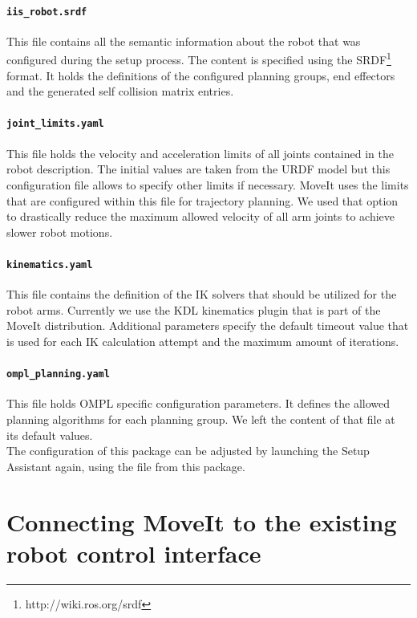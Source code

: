 \paragraph{\texttt{iis\_robot.srdf}}
This file contains all the semantic information about the robot that was configured during the setup process. The content is specified using the SRDF\footnote{http://wiki.ros.org/srdf} format. It holds the definitions of the configured planning groups, end effectors and the generated self collision matrix entries.

\paragraph{\texttt{joint\_limits.yaml}}
This file holds the velocity and acceleration limits of all joints contained in the robot description. The initial values are taken from the URDF model but this configuration file allows to specify other limits if necessary. MoveIt uses the limits that are configured within this file for trajectory planning. We used that option to drastically reduce the maximum allowed velocity of all arm joints to achieve slower robot motions.

\paragraph{\texttt{kinematics.yaml}}
This file contains the definition of the IK solvers that should be utilized for the robot arms. Currently we use the KDL kinematics plugin that is part of the MoveIt distribution. Additional parameters specify the default timeout value that is used for each IK calculation attempt and the maximum amount of iterations.

\paragraph{\texttt{ompl\_planning.yaml}}
This file holds OMPL specific configuration parameters. It defines the allowed planning algorithms for each planning group. We left the content of that file at its default values. \\

The configuration of this package can be adjusted by launching the Setup Assistant again, using the  file from this package.

\section{Connecting MoveIt to the existing robot control interface}
\label{sec:hardware_adapter}

